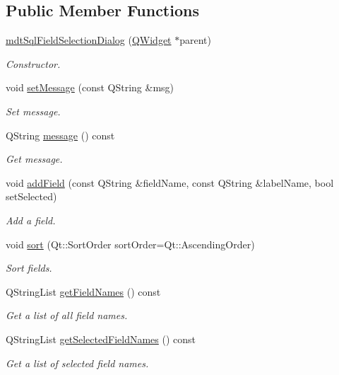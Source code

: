 \subsection*{Public Member Functions}
\begin{DoxyCompactItemize}
\item 
\hyperlink{classmdt_sql_field_selection_dialog_a4e5e921627be11b9f2ee31c7486fa988}{mdt\-Sql\-Field\-Selection\-Dialog} (\hyperlink{class_q_widget}{Q\-Widget} $\ast$parent)
\begin{DoxyCompactList}\small\item\em Constructor. \end{DoxyCompactList}\item 
void \hyperlink{classmdt_sql_field_selection_dialog_a81107b3259b691bdc3d6706a98114009}{set\-Message} (const Q\-String \&msg)
\begin{DoxyCompactList}\small\item\em Set message. \end{DoxyCompactList}\item 
Q\-String \hyperlink{classmdt_sql_field_selection_dialog_abb016dfa7f3ebea4fa9ab3a14e9911a3}{message} () const 
\begin{DoxyCompactList}\small\item\em Get message. \end{DoxyCompactList}\item 
void \hyperlink{classmdt_sql_field_selection_dialog_aa84e90fd91db7b7f6f282f71a9d8ca17}{add\-Field} (const Q\-String \&field\-Name, const Q\-String \&label\-Name, bool set\-Selected)
\begin{DoxyCompactList}\small\item\em Add a field. \end{DoxyCompactList}\item 
void \hyperlink{classmdt_sql_field_selection_dialog_af4bc8b54c70c9b37eee911e51112fcbd}{sort} (Qt\-::\-Sort\-Order sort\-Order=Qt\-::\-Ascending\-Order)
\begin{DoxyCompactList}\small\item\em Sort fields. \end{DoxyCompactList}\item 
Q\-String\-List \hyperlink{classmdt_sql_field_selection_dialog_ac7731151791953d41b6f9156060df70b}{get\-Field\-Names} () const 
\begin{DoxyCompactList}\small\item\em Get a list of all field names. \end{DoxyCompactList}\item 
Q\-String\-List \hyperlink{classmdt_sql_field_selection_dialog_a1c55f001c16ab578ac564b3349897e5d}{get\-Selected\-Field\-Names} () const 
\begin{DoxyCompactList}\small\item\em Get a list of selected field names. \end{DoxyCompactList}\end{DoxyCompactItemize}


